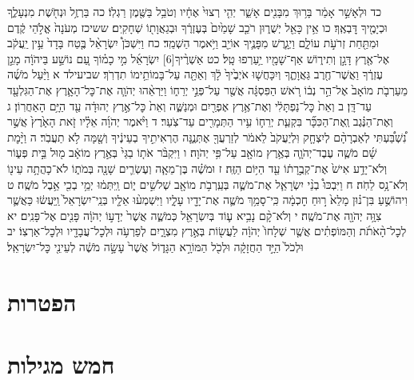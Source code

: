 \documentclass[twoside, openany, parskip=half, 11pt]{book}
\begin{document}
כד וּלְאָשֵׁ֣ר אָמַ֔ר בָּר֥וּךְ מִבָּנִ֖ים אָשֵׁ֑ר יְהִ֤י רְצוּי֙ אֶחָ֔יו וְטֹבֵ֥ל בַּשֶּׁ֖מֶן רַגְלֽוֹ׃ כה בַּרְזֶ֥ל וּנְחֹ֖שֶׁת מִנְעָלֶ֑ךָ וּכְיָמֶ֖יךָ דׇּבְאֶֽךָ׃ כו אֵ֥ין כָּאֵ֖ל יְשֻׁר֑וּן רֹכֵ֤ב שָׁמַ֙יִם֙ בְּעֶזְרֶ֔ךָ וּבְגַאֲוָת֖וֹ שְׁחָקִֽים׃ ששיכז מְעֹנָה֙ אֱלֹ֣הֵי קֶ֔דֶם וּמִתַּ֖חַת זְרֹעֹ֣ת עוֹלָ֑ם וַיְגָ֧רֶשׁ מִפָּנֶ֛יךָ אוֹיֵ֖ב וַיֹּ֥אמֶר הַשְׁמֵֽד׃ כח וַיִּשְׁכֹּן֩ יִשְׂרָאֵ֨ל בֶּ֤טַח בָּדָד֙ עֵ֣ין יַֽעֲקֹ֔ב אֶל־אֶ֖רֶץ דָּגָ֣ן וְתִיר֑וֹשׁ אַף־שָׁמָ֖יו יַ֥עַרְפוּ טָֽל׃ כט אַשְׁרֶ֨יךָ‏[6] יִשְׂרָאֵ֜ל מִ֣י כָמ֗וֹךָ עַ֚ם נוֹשַׁ֣ע בַּיהֹוָ֔ה מָגֵ֣ן עֶזְרֶ֔ךָ וַאֲשֶׁר־חֶ֖רֶב גַּאֲוָתֶ֑ךָ וְיִכָּחֲשׁ֤וּ אֹיְבֶ֙יךָ֙ לָ֔ךְ וְאַתָּ֖ה עַל־בָּמוֹתֵ֥ימוֹ תִדְרֹֽךְ׃
שביעילד א וַיַּ֨עַל מֹשֶׁ֜ה מֵעַרְבֹ֤ת מוֹאָב֙ אֶל־הַ֣ר נְב֔וֹ רֹ֚אשׁ הַפִּסְגָּ֔ה אֲשֶׁ֖ר עַל־פְּנֵ֣י יְרֵח֑וֹ וַיַּרְאֵ֨הוּ יְהֹוָ֧ה אֶת־כׇּל־הָאָ֛רֶץ אֶת־הַגִּלְעָ֖ד עַד־דָּֽן׃ ב וְאֵת֙ כׇּל־נַפְתָּלִ֔י וְאֶת־אֶ֥רֶץ אֶפְרַ֖יִם וּמְנַשֶּׁ֑ה וְאֵת֙ כׇּל־אֶ֣רֶץ יְהוּדָ֔ה עַ֖ד הַיָּ֥ם הָאַחֲרֽוֹן׃ ג וְאֶת־הַנֶּ֗גֶב וְֽאֶת־הַכִּכָּ֞ר בִּקְעַ֧ת יְרֵח֛וֹ עִ֥יר הַתְּמָרִ֖ים עַד־צֹֽעַר׃ ד וַיֹּ֨אמֶר יְהֹוָ֜ה אֵלָ֗יו זֹ֤את הָאָ֙רֶץ֙ אֲשֶׁ֣ר נִ֠שְׁבַּ֠עְתִּי לְאַבְרָהָ֨ם לְיִצְחָ֤ק וּֽלְיַעֲקֹב֙ לֵאמֹ֔ר לְזַרְעֲךָ֖ אֶתְּנֶ֑נָּה הֶרְאִיתִ֣יךָ בְעֵינֶ֔יךָ וְשָׁ֖מָּה לֹ֥א תַעֲבֹֽר׃ ה וַיָּ֨מׇת שָׁ֜ם מֹשֶׁ֧ה עֶבֶד־יְהֹוָ֛ה בְּאֶ֥רֶץ מוֹאָ֖ב עַל־פִּ֥י יְהֹוָה׃ ו וַיִּקְבֹּ֨ר אֹת֤וֹ בַגַּי֙ בְּאֶ֣רֶץ מוֹאָ֔ב מ֖וּל בֵּ֣ית פְּע֑וֹר וְלֹא־יָדַ֥ע אִישׁ֙ אֶת־קְבֻ֣רָת֔וֹ עַ֖ד הַיּ֥וֹם הַזֶּֽה׃ ז וּמֹשֶׁ֗ה בֶּן־מֵאָ֧ה וְעֶשְׂרִ֛ים שָׁנָ֖ה בְּמֹת֑וֹ לֹא־כָהֲתָ֥ה עֵינ֖וֹ וְלֹא־נָ֥ס לֵחֹֽה׃ ח וַיִּבְכּוּ֩ בְנֵ֨י יִשְׂרָאֵ֧ל אֶת־מֹשֶׁ֛ה בְּעַֽרְבֹ֥ת מוֹאָ֖ב שְׁלֹשִׁ֣ים י֑וֹם וַֽיִּתְּמ֔וּ יְמֵ֥י בְכִ֖י אֵ֥בֶל מֹשֶֽׁה׃ ט וִיהוֹשֻׁ֣עַ בִּן־נ֗וּן מָלֵא֙ ר֣וּחַ חׇכְמָ֔ה כִּֽי־סָמַ֥ךְ מֹשֶׁ֛ה אֶת־יָדָ֖יו עָלָ֑יו וַיִּשְׁמְע֨וּ אֵלָ֤יו בְּנֵֽי־יִשְׂרָאֵל֙ וַֽיַּעֲשׂ֔וּ כַּאֲשֶׁ֛ר צִוָּ֥ה יְהֹוָ֖ה אֶת־מֹשֶֽׁה׃ י וְלֹא־קָ֨ם נָבִ֥יא ע֛וֹד בְּיִשְׂרָאֵ֖ל כְּמֹשֶׁ֑ה אֲשֶׁר֙ יְדָע֣וֹ יְהֹוָ֔ה פָּנִ֖ים אֶל־פָּנִֽים׃ יא לְכׇל־הָ֨אֹתֹ֜ת וְהַמּוֹפְתִ֗ים אֲשֶׁ֤ר שְׁלָחוֹ֙ יְהֹוָ֔ה לַעֲשׂ֖וֹת בְּאֶ֣רֶץ מִצְרָ֑יִם לְפַרְעֹ֥ה וּלְכׇל־עֲבָדָ֖יו וּלְכׇל־אַרְצֽוֹ׃ יב וּלְכֹל֙ הַיָּ֣ד הַחֲזָקָ֔ה וּלְכֹ֖ל הַמּוֹרָ֣א הַגָּד֑וֹל אֲשֶׁר֙ עָשָׂ֣ה מֹשֶׁ֔ה לְעֵינֵ֖י כׇּל־יִשְׂרָאֵֽל׃

\chapter[הפטרות]{הפטרות}

\chapter[חמש מגילות]{חמש מגילות}
\end{document}
